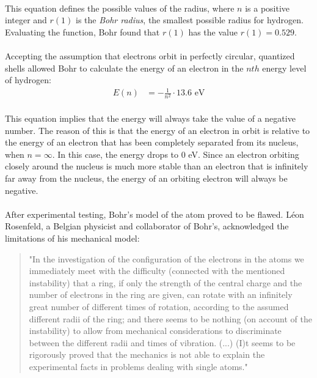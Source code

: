 \documentclass[letter]{article}
\begin{document}
\begin{enumerate}
    \paragraph{}This equation defines the possible values of the radius, where $n$ is a positive integer and $r(1)$ is the \textit{Bohr radius}, the smallest possible radius for hydrogen. Evaluating the function, Bohr found that $r(1)$ has the value $r(1)=0.529$.
    \paragraph{}Accepting the assumption that electrons orbit in perfectly circular, quantized shells allowed Bohr to calculate the energy of an electron in the $nth$ energy level of hydrogen:
    \begin{equation}
        \begin{split}
            E(n) 
            &= -\frac{1}{n^2}\cdot 13.6 \text{ eV}
        \end{split}
    \end{equation}
    \paragraph{}This equation implies that the energy will always take the value of a negative number. The reason of this is that the energy of an electron in orbit is relative to the energy of an electron that has been completely separated from its nucleus, when $n=\infty$. In this case, the energy drops to $0$ eV. Since an electron orbiting closely around the nucleus is much more stable than an electron that is infinitely far away from the nucleus, the energy of an orbiting electron will always be negative.
    \paragraph{}After experimental testing, Bohr's model of the atom proved to be flawed. Léon Rosenfeld, a Belgian physicist and collaborator of Bohr's, acknowledged the limitations of his mechanical model:
    \blockquote{"In the investigation of the configuration of the electrons in the atoms we immediately meet with the difficulty (connected with the mentioned instability) that a ring, if only the strength of the central charge and the number of electrons in the ring are given, can rotate with an infinitely great number of different times of rotation, according to the assumed different radii of the ring; and there seems to be nothing (on account of the instability) to allow from mechanical considerations to discriminate between the different radii and times of vibration. (...) (I)t seems to be rigorously proved that the mechanics is not able to explain the experimental facts in problems dealing with single atoms."\cite{Heilbron, J. et al. (1969)}}
    \vspace{10mm}
    \end{enumerate}
\end{document}
